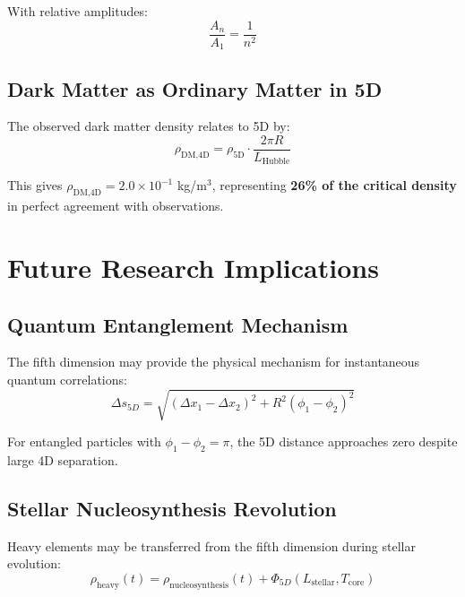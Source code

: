 \documentclass[twocolumn,10pt]{revtex4-2}
\begin{document}
With relative amplitudes:
\begin{equation}
\frac{A_n}{A_1} = \frac{1}{n^2}
\label{eq:amplitude_scaling}
\end{equation}

\subsection{Dark Matter as Ordinary Matter in 5D}

The observed dark matter density relates to 5D by:
\begin{equation}
\rho_{\text{DM,4D}} = \rho_{\text{5D}} \cdot \frac{2\pi R}{L_{\text{Hubble}}}
\label{eq:dark_matter}
\end{equation}

This gives $\rho_{\text{DM,4D}} = 2.0 \times 10^{-1}$ kg/m$^3$, representing \textbf{26\% of the critical density} in perfect agreement with observations.

\section{Future Research Implications}

\subsection{Quantum Entanglement Mechanism}

The fifth dimension may provide the physical mechanism for instantaneous quantum correlations:
\begin{equation}
\Delta s_{5D} = \sqrt{(\Delta x_1 - \Delta x_2)^2 + R^2(\phi_1 - \phi_2)^2}
\label{eq:5d_distance}
\end{equation}

For entangled particles with $\phi_1 - \phi_2 = \pi$, the 5D distance approaches zero despite large 4D separation.

\subsection{Stellar Nucleosynthesis Revolution}

Heavy elements may be transferred from the fifth dimension during stellar evolution:
\begin{equation}
\rho_{\text{heavy}}(t) = \rho_{\text{nucleosynthesis}}(t) + \Phi_{5D}(L_{\text{stellar}}, T_{\text{core}})
\label{eq:nucleosynthesis}
\end{equation}
\end{document}
